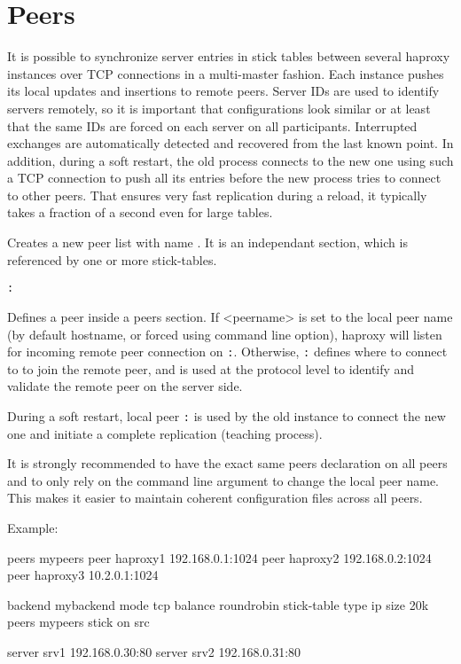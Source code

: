 
\section{Peers}

It is possible to synchronize server entries in stick tables between several
haproxy instances over TCP connections in a multi-master fashion. Each instance
pushes its local updates and insertions to remote peers. Server IDs are used to
identify servers remotely, so it is important that configurations look similar
or at least that the same IDs are forced on each server on all participants.
Interrupted exchanges are automatically detected and recovered from the last
known point. In addition, during a soft restart, the old process connects to
the new one using such a TCP connection to push all its entries before the new
process tries to connect to other peers. That ensures very fast replication
during a reload, it typically takes a fraction of a second even for large
tables.

\begin{keywords}

 

  Creates a new peer list with name . It is an independant section,
  which is referenced by one or more stick-tables.

  \texttt{:}

  Defines a peer inside a peers section.
  If <peername> is set to the local peer name (by default hostname, or forced
  using  command line option), haproxy will listen for incoming remote peer
  connection on \texttt{:}. 
  Otherwise, \texttt{:} defines where to connect to
  to join the remote peer, and  is used at the protocol level to
  identify and validate the remote peer on the server side.

  During a soft restart, local peer \texttt{:} is used by 
  the old instance to connect the new one and initiate a complete replication
  (teaching process).

  It is strongly recommended to have the exact same peers declaration on all
  peers and to only rely on the  command line argument to change the local
  peer name. This makes it easier to maintain coherent configuration files
  across all peers.

Example:
\begin{listing}{1}
peers mypeers
    peer haproxy1 192.168.0.1:1024
    peer haproxy2 192.168.0.2:1024
    peer haproxy3 10.2.0.1:1024

backend mybackend
    mode tcp
    balance roundrobin
    stick-table type ip size 20k peers mypeers
    stick on src

    server srv1 192.168.0.30:80
    server srv2 192.168.0.31:80
\end{listing}

\end{keywords}
